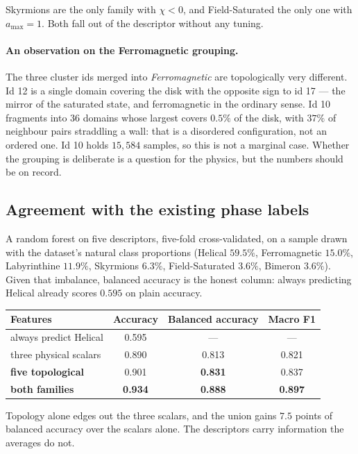 \documentclass[11pt,a4paper]{article}
\newcommand{\best}[1]{\textbf{#1}}
\begin{document}
Skyrmions are the only family with $\chi<0$, and Field-Saturated the only one with
$a_{\max}=1$. Both fall out of the descriptor without any tuning.

\paragraph{An observation on the Ferromagnetic grouping.}
The three cluster ids merged into \emph{Ferromagnetic} are topologically very different.
Id 12 is a single domain covering the disk with the opposite sign to id 17 --- the mirror of
the saturated state, and ferromagnetic in the ordinary sense. Id 10 fragments into
36 domains whose largest covers $0.5\%$ of the disk, with $37\%$ of neighbour pairs
straddling a wall: that is a disordered configuration, not an ordered one. Id 10 holds
$15{,}584$ samples, so this is not a marginal case. Whether the grouping is deliberate is a
question for the physics, but the numbers should be on record.

\subsection{Agreement with the existing phase labels}

A random forest on five descriptors, five-fold cross-validated, on a sample drawn with the
dataset's natural class proportions (Helical $59.5\%$, Ferromagnetic $15.0\%$,
Labyrinthine $11.9\%$, Skyrmions $6.3\%$, Field-Saturated $3.6\%$, Bimeron $3.6\%$).
Given that imbalance, balanced accuracy is the honest column: always predicting Helical
already scores $0.595$ on plain accuracy.

\begin{table}[H]
\centering
\begin{tabular}{lccc}
\toprule
Features & Accuracy & \best{Balanced accuracy} & Macro F1 \\
\midrule
always predict Helical      & 0.595 & --- & --- \\
three physical scalars      & 0.890 & 0.813 & 0.821 \\
\best{five topological}     & 0.901 & \best{0.831} & 0.837 \\
\best{both families}        & \best{0.934} & \best{0.888} & \best{0.897} \\
\bottomrule
\end{tabular}
\end{table}

Topology alone edges out the three scalars, and the union gains $7.5$ points of balanced
accuracy over the scalars alone. The descriptors carry information the averages do not.
\end{document}
